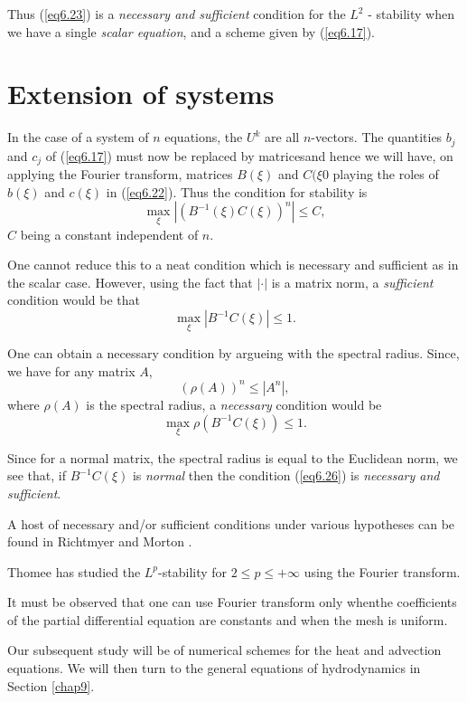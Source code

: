 Thus (\ref{eq6.23}) is a {\em necessary and sufficient} condition for the
$L^2$ - stability when we have a single {\em scalar equation}, and a
scheme given by (\ref{eq6.17}).

\section{Extension of systems}\label{chap6:sec6.4}
In the case of a system of $n$ equations, the $U^k$  are all
$n$-vectors. The quantities $b_j$ and $c_j$ of (\ref{eq6.17}) must now be
replaced by matrices\pageoriginale and hence we will have, on applying
the Fourier transform, matrices $B(\xi)$ and $C(\xi0$ playing the
roles of $b(\xi)$ and $c(\xi)$ in (\ref{eq6.22}). Thus the condition for
stability is 
\begin{equation*}
\max\limits_\xi |(B^{-1} (\xi) C(\xi))^n| \leq C,
\tag{6.24}\label{eq6.24}
\end{equation*}
$C$ being a constant independent of $n$.

One cannot reduce this to a neat condition which is necessary and
sufficient as in the scalar case. However, using the fact that
$|\cdot|$ is a matrix norm, a {\em sufficient} condition would be that
\begin{equation*}
\max\limits_\xi |B^{-1} C(\xi)| \leq 1.
\tag{6.25}\label{eq6.25}
\end{equation*}

One can obtain a necessary condition by argueing with the spectral
radius. Since, we have for any matrix $A$,
$$
(\rho (A))^n \leq |A^n|,
$$
where $\rho (A)$ is the spectral radius, a {\em necessary}
condition would be 
\begin{equation*}
\max\limits_\xi \rho (B^{-1} C(\xi)) \leq 1. 
\tag{6.26}\label{eq6.26}
\end{equation*}

Since for a normal matrix, the spectral radius is equal to the
Euclidean norm, we see that, if $B^{-1}C(\xi)$ is {\em normal} then
the condition (\ref{eq6.26}) is {\em necessary and sufficient}.

A host of necessary and/or sufficient conditions under various
hypotheses can be found in Richtmyer and Morton \cite{key32}.

Thomee \cite{key36} has studied the $L^p$-stability for $2 \leq  p
\leq + \infty$ using the Fourier transform.

\begin{remark}\label{chap6:rem6.3}
It must be observed that one can use Fourier transform only
when\pageoriginale the coefficients of the partial differential
equation are constants and when the mesh is uniform.
\end{remark}

Our subsequent study will be of numerical schemes for the heat and
advection equations. We will then turn to the general equations of
hydrodynamics in Section \ref{chap9}.
